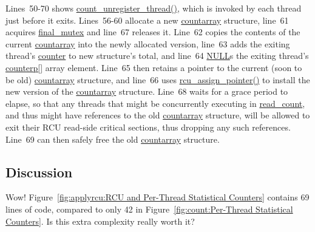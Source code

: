 Lines~50-70 shows \url{count_unregister_thread()}, which is invoked
by each thread just before it exits.
Lines~56-60 allocate a new \url{countarray} structure,
line~61 acquires \url{final_mutex} and line~67 releases it.
Line~62 copies the contents of the current \url{countarray} into
the newly allocated version, line~63 adds the exiting thread's \url{counter}
to new structure's total, and line~64 \url{NULL}s the exiting thread's
\url{counterp[]} array element.
Line~65 then retains a pointer to the current (soon to be old)
\url{countarray} structure, and line~66 uses \url{rcu_assign_pointer()}
to install the new version of the \url{countarray} structure.
Line~68 waits for a grace period to elapse, so that any threads that
might be concurrently executing in \url{read_count}, and thus might
have references to the old \url{countarray} structure, will be allowed
to exit their RCU read-side critical sections, thus dropping any such
references.
Line~69 can then safely free the old \url{countarray} structure.

\subsection{Discussion}

\QuickQuiz{}
	Wow!
	Figure~\ref{fig:applyrcu:RCU and Per-Thread Statistical Counters}
	contains 69 lines of code, compared to only 42 in
	Figure~\ref{fig:count:Per-Thread Statistical Counters}.
	Is this extra complexity really worth it?
 \QuickQuizEnd

